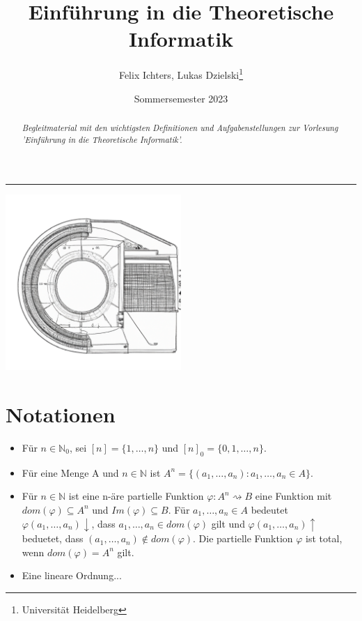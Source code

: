 \documentclass[DIV=15]{scrartcl}
\title{Einführung in die Theoretische Informatik}
\author{Felix Ichters, Lukas Dzielski\thanks{Universität Heidelberg}}
\date{Sommersemester 2023}
\begin{document}
\maketitle
\rule{467.1pt}{0.4pt}

\begin{abstract}
\begin{flushright}
    \textit{Begleitmaterial mit den wichtigsten Definitionen und Aufgabenstellungen zur Vorlesung 'Einführung in die Theoretische Informatik'.}
\end{flushright}    
\end{abstract}
\bigskip\bigskip
\begin{center}
\includegraphics[width=0.5\textwidth]{dall2.png}    
\end{center}

\newpage
\tableofcontents
\newpage
\section{Notationen}
\begin{itemize}
    \item Für \(n\in\mathbb{N}_0\), sei \([n]=\{1,\dots,n\}\) und \([n]_0=\{0,1,\dots,n\}\).
    \item Für eine Menge A und \(n\in\mathbb{N}\) ist \(A^n=\{(a_1,\dots,a_n):a_1,\dots,a_n\in A\}\).
    \item Für \(n\in\mathbb{N}\) ist eine n-äre partielle Funktion \(\varphi:A^n\rightsquigarrow B\) eine Funktion
    mit \(dom(\varphi)\subseteq A^n\) und \(Im(\varphi)\subseteq B\).
    Für \(a_1,\dots,a_n\in A\) bedeutet \(\varphi(a_1,\dots,a_n)\downarrow\), dass \(a_1,\dots,a_n\in dom(\varphi)\) gilt und 
    \(\varphi(a_1,\dots,a_n)\uparrow\) beduetet, dass \((a_1,\dots,a_n)\notin dom(\varphi)\).
    Die partielle Funktion \(\varphi\) ist total, wenn \(dom(\varphi)=A^n\) gilt.
    \item Eine lineare Ordnung...
\end{itemize}
\end{document}
